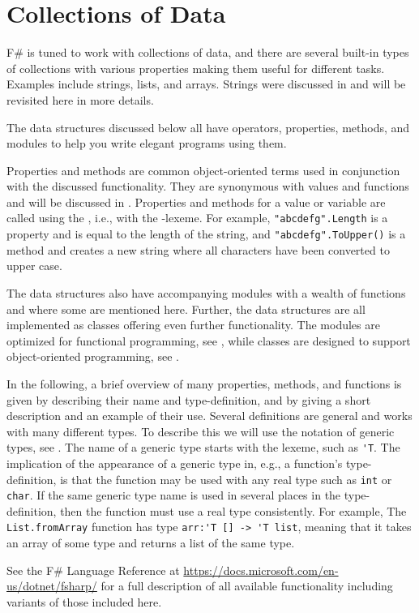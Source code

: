 \chapter{Collections of Data}
\label{chap:lists}
F\# is tuned to work with collections of data, and there are several built-in types of collections with various properties making them useful for different tasks. Examples include strings, lists, and arrays. Strings were discussed in  and will be revisited here in more details.

The data structures discussed below all have operators, properties, methods, and modules to help you write elegant programs using them.

Properties and methods are common object-oriented terms used in conjunction with the discussed functionality. They are synonymous with values and functions and will be discussed in . Properties and methods for a value or variable are called using the , i.e., with the -lexeme. For example, \lstinline{"abcdefg".Length} is a property and is equal to the length of the string, and \lstinline|"abcdefg".ToUpper()| is a method and creates a new string where all characters have been converted to upper case.

The data structures also have accompanying modules with a wealth of functions and where some are mentioned here. Further, the data structures are all implemented as classes offering even further functionality. The modules are optimized for functional programming, see , while classes are designed to support object-oriented programming, see .

In the following, a brief overview of many properties, methods, and functions is given by describing their name and type-definition, and by giving a short description and an example of their use. Several definitions are general and works with many different types. To describe this we will use the notation of generic types, see . The name of a generic type starts with the  lexeme, such as \lstinline{'T}. The implication of the appearance of a generic type in, e.g., a function's type-definition, is that the function may be used with any real type such as \lstinline{int} or \lstinline{char}. If the same generic type name is used in several places in the type-definition, then the function must use a real type consistently. For example, The \lstinline{List.fromArray} function has type \lstinline{arr:'T [] -> 'T list}, meaning that it takes an array of some type and returns a list of the same type.

See the F\# Language Reference at \url{https://docs.microsoft.com/en-us/dotnet/fsharp/} for a full description of all available functionality including variants of those included here.

